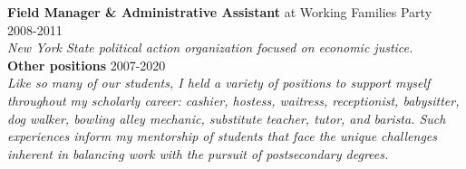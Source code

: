 \documentclass[]{article}
\begin{document}
\textbf{Field Manager \& Administrative Assistant} at Working Families Party \hfill 2008-2011\\
\textit{New York State political action organization focused on economic justice.}\\

\textbf{Other positions} \hfill 2007-2020\\
\textit{Like so many of our students, I held a variety of positions to support myself throughout my scholarly career: cashier, hostess, waitress, receptionist, babysitter, dog walker, bowling alley mechanic, substitute teacher, tutor, and barista. Such experiences inform my mentorship of students that face the unique challenges inherent in balancing work with the pursuit of postsecondary degrees.}

\vspace{3mm}
\end{document}
